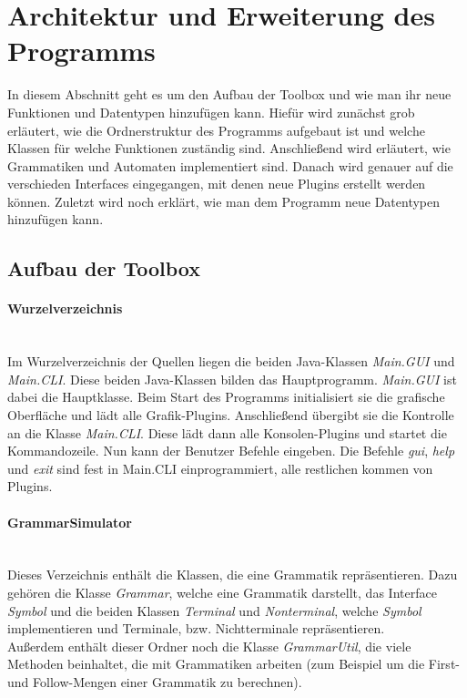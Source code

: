 \section{Architektur und Erweiterung des Programms}\raggedbottom
\label{sec:3}
In diesem Abschnitt geht es um den Aufbau der Toolbox und wie man ihr neue Funktionen und Datentypen hinzufügen kann. Hiefür wird zunächst grob erläutert, wie die Ordnerstruktur des Programms aufgebaut ist und welche Klassen für welche Funktionen zuständig sind. Anschließend wird erläutert, wie Grammatiken und Automaten implementiert sind. Danach wird genauer auf die verschieden Interfaces eingegangen, mit denen neue Plugins erstellt werden können. Zuletzt wird noch erklärt, wie man dem Programm neue Datentypen hinzufügen kann.
\subsection{Aufbau der Toolbox}
\label{sec:3.1}
\paragraph{Wurzelverzeichnis}\ \\
Im Wurzelverzeichnis der Quellen liegen die beiden Java-Klassen \textit{Main.GUI} und \textit{Main.CLI}. Diese beiden Java-Klassen bilden das Hauptprogramm. \textit{Main.GUI} ist dabei die Hauptklasse. Beim Start des Programms initialisiert sie die grafische Oberfläche und lädt alle Grafik-Plugins. Anschließend übergibt sie die Kontrolle an die Klasse \textit{Main.CLI}. Diese lädt dann alle Konsolen-Plugins und startet die Kommandozeile. Nun kann der Benutzer Befehle eingeben. Die Befehle \textit{gui}, \textit{help} und \textit{exit} sind fest in Main.CLI einprogrammiert, alle restlichen kommen von Plugins.
\paragraph{GrammarSimulator}\ \\
Dieses Verzeichnis enthält die Klassen, die eine Grammatik repräsentieren. Dazu gehören die Klasse \textit{Grammar}, welche eine Grammatik darstellt, das Interface \textit{Symbol} und die beiden Klassen \textit{Terminal} und \textit{Nonterminal}, welche \textit{Symbol} implementieren und Terminale, bzw. Nichtterminale repräsentieren.\\
Außerdem enthält dieser Ordner noch die Klasse \textit{GrammarUtil}, die viele Methoden beinhaltet, die mit Grammatiken arbeiten (zum Beispiel um die First- und Follow-Mengen einer Grammatik zu berechnen).
